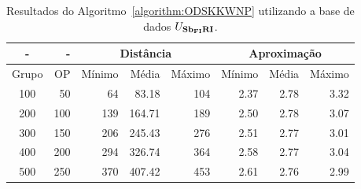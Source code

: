 \begin{table}[!htb]
  \caption{Resultados do Algoritmo~\ref{algorithm:ODSKKWNP} utilizando a base de dados $U_{\textbf{Sb\textsubscript{FI}RI}}{}$.}
  \label{table:EZSBDOGH}
  \centering
  \begin{tabular}{|c|r|r|r|r|r|r|r|}
    \hline
      -      &  -   & \multicolumn{3}{c|}{Distância}             & \multicolumn{3}{c|}{Aproximação}           \\ \hline
    Grupo    & OP   & Mínimo       & Média        & Máximo       & Mínimo       & Média        & Máximo       \\ \hline  
    100      & 50   & 64           &  83.18       & 104          & 2.37         & 2.78         & 3.32         \\ \hline
    200      & 100  & 139          & 164.71       & 189          & 2.50         & 2.78         & 3.07         \\ \hline
    300      & 150  & 206          & 245.43       & 276          & 2.51         & 2.77         & 3.01         \\ \hline
    400      & 200  & 294          & 326.74       & 364          & 2.58         & 2.77         & 3.04         \\ \hline
    500      & 250  & 370          & 407.42       & 453          & 2.61         & 2.76         & 2.99         \\ \hline    
  \end{tabular}
\end{table}